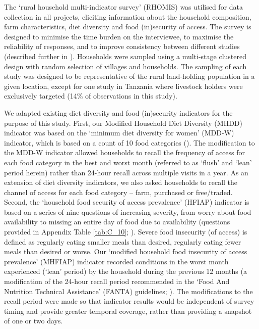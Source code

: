 The `rural household multi-indicator survey' (RHOMIS) was utilised for data collection in all projects, eliciting information about the household composition, farm characteristics, diet diversity and food (in)security of access. The survey is designed to minimise the time burden on the interviewee, to maximise the reliability of responses, and to improve consistency between different studies (described further in \citealp{Hammond2017225}). Households were sampled using a multi-stage clustered design with random selection of villages and households. The sampling of each study was designed to be representative of the rural land-holding population in a given location, except for one study in Tanzania where livestock holders were exclusively targeted (14\% of observations in this study).

We adapted existing diet diversity and food (in)security indicators for the purpose of this study. First, our Modified Household Diet Diversity (MHDD) indicator was based on the `minimum diet diversity for women' (MDD-W) indicator, which is based on a count of 10 food categories (\citealp{FAO2016}). The modification to the MDD-W indicator allowed households to recall the frequency of access for each food category in the best and worst month (referred to as `flush' and `lean' period herein) rather than 24-hour recall across multiple visits in a year. As an extension of diet diversity indicators, we also asked households to recall the channel of access for each food category -- farm, purchased or free/traded. Second, the `household food security of access prevalence' (HFIAP) indicator is based on a series of nine questions of increasing severity, from worry about food availability to missing an entire day of food due to availability (questions provided in Appendix Table \ref{tab:C_10}; \citealp{Coates2007}). Severe food insecurity (of access) is defined as regularly eating smaller meals than desired, regularly eating fewer meals than desired or worse. Our `modified household food insecurity of access prevalence' (MHFIAP) indicator recorded conditions in the worst month experienced (`lean' period) by the household during the previous 12 months (a modification of the 24-hour recall period recommended in the `Food And Nutrition Technical Assistance' (FANTA) guidelines; \citealp{Coates2007}). The modifications to the recall period were made so that indicator results would be independent of survey timing and provide greater temporal coverage, rather than providing a snapshot of one or two days.

